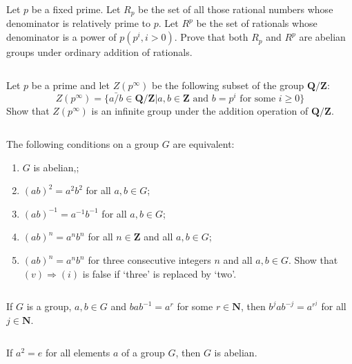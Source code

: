 $$ $$

\begin{ex}
    Let $p$ be a fixed prime. Let $R_p$ be the set of all those rational numbers whose denominator is relatively prime to $p$. Let $R^p$ be the set of rationals whose denominator is a power of $p (p^i, i > 0)$. Prove that both $R_p$ and $R^p$ are abelian groups under ordinary addition of rationals.
\end{ex}

$$ $$

\begin{ex}
    Let $p$ be a prime and let $Z(p^\infty)$ be the following subset of the group $\mathbf{Q}/\mathbf{Z}$:\[Z(p^\infty)=\{\bar{a/b}\in\mathbf{Q}/\mathbf{Z}| a,b \in \mathbf{Z} \text{ and } b=p^i \text{ for some }i\geq 0\}\]
    Show that $Z(p^\infty)$ is an infinite group under the addition operation of $\mathbf{Q}/\mathbf{Z}$.
\end{ex}

$$ $$

\begin{ex}
    The following conditions on a group $G$ are equivalent:
    \begin{enumerate}
        \item $G$ is abelian,;
        \item $(ab)^2=a^{2}b^{2}$ for all $a,b\in G$;
        \item $(ab)^{-1}=a^{-1}b^{-1}$ for all $a,b \in G$;
        \item $(ab)^{n}=a^{n}b^{n}$ for all $n\in \mathbf{Z}$ and all $a,b \in G$;
        \item $(ab)^{n}=a^{n}b^{n}$ for three consecutive integers $n$ and all $a,b \in G$. Show that $(v)\Rightarrow (i)$ is false if `three' is replaced by `two'.
    \end{enumerate}
\end{ex}

$$ $$

\begin{ex}
    If $G$ is a group, $a,b\in G$ and $bab^{-1}=a^{r}$ for some $r\in \mathbf{N}$, then $b^{j}ab^{-j}=a^{r^{j}}$ for all $j\in \mathbf{N}$. 
\end{ex}

$$ $$

\begin{ex}
    If $a^{2}=e$ for all elements $a$ of a group $G$, then $G$ is abelian.
\end{ex}

$$ $$

